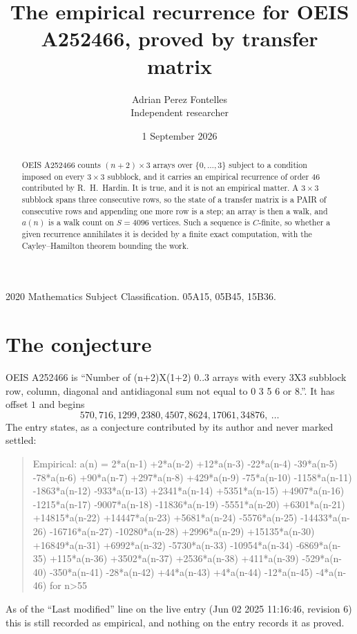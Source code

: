 \documentclass[11pt,a4paper]{article}
\title{The empirical recurrence for OEIS A252466, proved by transfer matrix}
\author{Adrian Perez Fontelles\\ \small Independent researcher}
\date{1 September 2026}
\theoremstyle{plain}
\theoremstyle{definition}
\begin{document}
\maketitle

\begin{abstract}
OEIS A252466 counts $(n+2)\times3$ arrays over $\{0,\dots,3\}$ subject to a condition imposed on
every $3\times3$ subblock, and it carries an empirical recurrence of order $46$
contributed by R.~H.~Hardin. It is true, and it is not an empirical matter. A $3\times3$
subblock spans three consecutive rows, so the state of a transfer matrix is a PAIR of
consecutive rows and appending one more row is a step; an array is then a walk, and
$a(n)$ is a walk count on $S=4096$ vertices. Such a sequence is $C$-finite, so whether a given
recurrence annihilates it is decided by a finite exact computation, with the Cayley--Hamilton
theorem bounding the work.
\end{abstract}

\noindent\small 2020 Mathematics Subject Classification. 05A15, 05B45, 15B36.\normalsize

\section{The conjecture}

OEIS A252466 is ``Number of (n+2)X(1+2) 0..3 arrays with every 3X3 subblock row, column, diagonal and antidiagonal sum not equal to 0 3 5 6 or 8.''. It has offset $1$ and begins
\[
570, 716, 1299, 2380, 4507, 8624, 17061, 34876,\ \dots
\]
The entry states, as a conjecture contributed by its author and never marked settled:
\begin{quote}
Empirical: a(n) = 2*a(n-1) +2*a(n-2) +12*a(n-3) -22*a(n-4) -39*a(n-5) -78*a(n-6) +90*a(n-7) +297*a(n-8) +429*a(n-9) -75*a(n-10) -1158*a(n-11) -1863*a(n-12) -933*a(n-13) +2341*a(n-14) +5351*a(n-15) +4907*a(n-16) -1215*a(n-17) -9007*a(n-18) -11836*a(n-19) -5551*a(n-20) +6301*a(n-21) +14815*a(n-22) +14447*a(n-23) +5681*a(n-24) -5576*a(n-25) -14433*a(n-26) -16716*a(n-27) -10280*a(n-28) +2996*a(n-29) +15135*a(n-30) +16849*a(n-31) +6992*a(n-32) -5730*a(n-33) -10954*a(n-34) -6869*a(n-35) +115*a(n-36) +3502*a(n-37) +2536*a(n-38) +411*a(n-39) -529*a(n-40) -350*a(n-41) -28*a(n-42) +44*a(n-43) +4*a(n-44) -12*a(n-45) -4*a(n-46) for n>55
\end{quote}
As of the ``Last modified'' line on the live entry (Jun 02 2025 11:16:46, revision 6) this is still
recorded as empirical, and nothing on the entry records it as proved.
\end{document}
